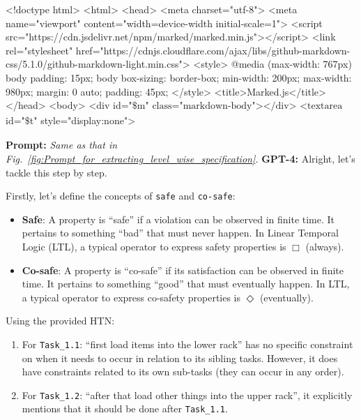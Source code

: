 

<!doctype html>
<html>
<head>
  <meta charset="utf-8">
  <meta name="viewport" content="width=device-width initial-scale=1">
  <script src="https://cdn.jsdelivr.net/npm/marked/marked.min.js"></script>
  <link rel="stylesheet" href="https://cdnjs.cloudflare.com/ajax/libs/github-markdown-css/5.1.0/github-markdown-light.min.css">
  <style>
@media (max-width: 767px) { body { padding: 15px; } }
body { box-sizing: border-box;
       min-width: 200px;
       max-width: 980px;
       margin: 0 auto;
       padding: 45px; }
  </style>
  <title>Marked.js</title>
</head>
<body>
  <div id="$m" class="markdown-body"></div>
  <textarea id="$t" style="display:none">
\begin{tcolorbox}[breakable,title=Dialog 3: Extracting task-wise specification between Task\_1.1 and Task\_1.2]
\textbf{Prompt: }{\it Same as that in Fig.~\ref{fig:Prompt_for_extracting_level_wise_specification}.}
\tcblower
\textbf{GPT-4:}
Alright, let's tackle this step by step.

Firstly, let's define the concepts of \texttt{safe} and \texttt{co-safe}:

\begin{itemize}
    \item \textbf{Safe}: A property is ``safe'' if a violation can be observed in finite time. It pertains to something ``bad'' that must never happen. In Linear Temporal Logic (LTL), a typical operator to express safety properties is $\Box$ (always).

    \item \textbf{Co-safe}: A property is ``co-safe'' if its satisfaction can be observed in finite time. It pertains to something ``good'' that must eventually happen. In LTL, a typical operator to express co-safety properties is $\Diamond$ (eventually).
\end{itemize}

Using the provided HTN:

\begin{enumerate}
    \item For \texttt{Task\_1.1}: ``first load items into the lower rack'' has no specific constraint on when it needs to occur in relation to its sibling tasks. However, it does have constraints related to its own sub-tasks (they can occur in any order).

    \item For \texttt{Task\_1.2}: ``after that load other things into the upper rack'', it explicitly mentions that it should be done after \texttt{Task\_1.1}.
\end{enumerate}


\end{tcolorbox}
